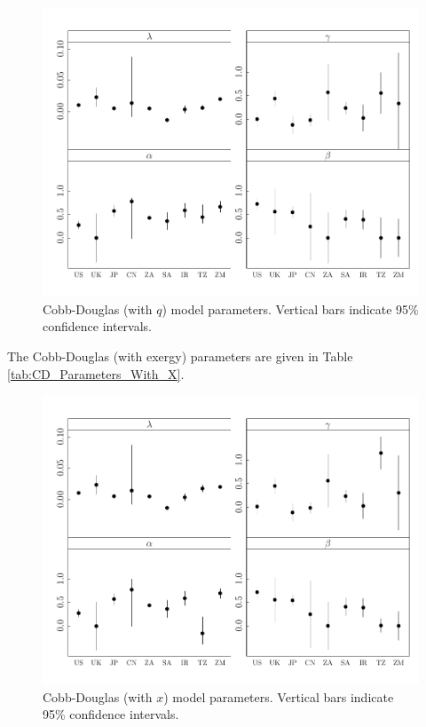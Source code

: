 \documentclass[preprint,authoryear,12pt]{elsarticle}\usepackage{graphicx, color}
\makeatletter
\def\maxwidth{ %
  \ifdim\Gin@nat@width>\linewidth
    \linewidth
  \else
    \Gin@nat@width
  \fi
}
\newenvironment{knitrout}{}{} %
\makeatother
\begin{document}
\begin{knitrout}
\color{fgcolor}\begin{figure}[]

\includegraphics[width=\maxwidth]{figure/CDq_Params_Graph} \caption[Cobb-Douglas (with $q$) model parameters]{Cobb-Douglas (with $q$) model parameters. Vertical bars indicate 95\% confidence intervals.\label{fig:CDq_Params_Graph}}
\end{figure}


\end{knitrout}


The Cobb-Douglas (with exergy) parameters are given in Table \ref{tab:CD_Parameters_With_X}.

\begin{knitrout}
\color{fgcolor}\begin{figure}[]

\includegraphics[width=\maxwidth]{figure/CDx_Params_Graph} \caption[Cobb-Douglas (with $x$) model parameters]{Cobb-Douglas (with $x$) model parameters. Vertical bars indicate 95\% confidence intervals.\label{fig:CDx_Params_Graph}}
\end{figure}


\end{knitrout}
\end{document}
